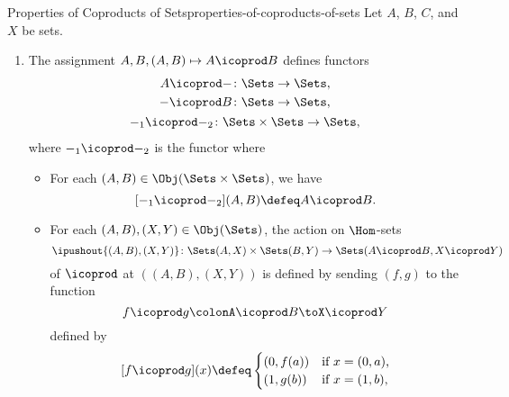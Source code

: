 \begin{proposition}{Properties of Coproducts of Sets}{properties-of-coproducts-of-sets}%
    Let $A$, $B$, $C$, and $X$ be sets.
    \begin{enumerate}
        \item\label{properties-of-coproducts-of-sets-functoriality}The assignment $A,B,(A,B)\mapsto A\icoprod B$ defines functors
            \begin{gather*}
                \begin{aligned}
                    A\icoprod-     &\colon           \Sets \to \Sets,\\
                    -\icoprod B   &\colon \Sets            \to \Sets,\\
                \end{aligned}\\
                -_{1}\icoprod-_{2} \colon \Sets\times\Sets \to \Sets,
            \end{gather*}
            where $-_{1}\icoprod-_{2}$ is the functor where
            \begin{itemize}
                \item{}For each $(A,B)\in\Obj(\Sets\times\Sets)$, we have
                    \[
                        [-_{1}\icoprod-_{2}](A,B)%
                        \defeq
                        A\icoprod B.%
                    \]%
                \item{}For each $(A,B),(X,Y)\in\Obj(\Sets)$, the action on $\Hom$-sets
                    \[
                        \ipushout{(A,B),(X,Y)}
                        \colon
                        \Sets(A,X)\times\Sets(B,Y)%
                        \to%
                        \Sets(A\icoprod B,X\icoprod Y)%
                    \]%
                    of $\icoprod$ at $((A,B),(X,Y))$ is defined by sending $(f,g)$ to the function
                    \[
                        f\icoprod g%
                        \colon%
                        A\icoprod B%
                        \to%
                        X\icoprod Y%
                    \]%
                    defined by
                    \[
                        [f\icoprod g](x)%
                        \defeq%
                        \begin{cases}
                            (0,f(a)) &\text{if $x=(0,a)$,}\\%
                            (1,g(b)) &\text{if $x=(1,b)$,}%
                        \end{cases}
\]
\end{itemize}
\end{enumerate}
\end{proposition}
